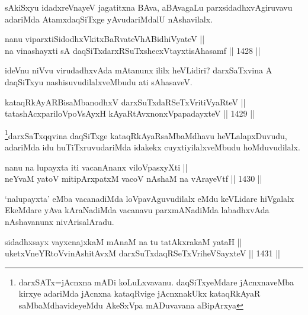 \begin{artha}
sAkiSxyu idadxreVnayeV jagatitxna BAva, aBAvagaLu parxsidadhxvAgiruvavu adariMda AtamxdaqSiTxge yAvudariMdalU nAshavilalx.
\end{artha}


\begin{shl}
nanu viparxtiSidodhxVkitxBaRvateVhABidhiVyateV || \\
na vinashayxti sA daqSiTxdarxRSuTxshecxVtayxtisAhasamf ||  1428 ||  
\end{shl}

\begin{artha}
ideVnu niVvu virudadhxvAda mAtanunx ililx heVLidiri? darxSaTxvina A daqSiTxyu nashisuvudilalxveMbudu ati sAhasaveV.
\end{artha}


\begin{shl}
kataqRkAyARBisaMbanodhxV darxSuTxdaRSeTxVritiVyaRteV || \\
tatashAcxpariloVpoV\s sAyxH kAyaRtAvxnonxVpapadayxteV ||  1429 ||  
\end{shl}

\begin{artha}
\footnote{darxSATx=jAcnxna mADi koLuLxvavanu. daqSiTxyeMdare jAcnxnaveMba kirxye adariMda jAcnxna kataqRvige jAcnxnakUkx kataqRkAyaR saMbaMdhavideyeMdu AkeSxVpa mADuvavana aBipArxya}darxSaTxqqvina daqSiTxge kataqRkAyaRsaMbaMdhavu heVLalapxDuvudu, adariMda idu huTiTxruvudariMda idakekx cuyxtiyilalxveMbudu hoMduvudilalx.
\end{artha}


\begin{shl}
nanu na lupayxta iti vacanAnanx viloVpasxyXti || \\
neYvaM yatoV mitipArxpatxM vacoV nAshaM na vArayeVtf ||  1430 ||  
\end{shl}

\begin{artha}
`nalupayxta' eMba vacanadiMda loVpavAguvudilalx eMdu keVLidare hiVgalalx EkeMdare yAva kAraNadiMda vacanavu parxmANadiMda labadhxvAda nAshavanunx nivArisalAradu.
\end{artha}


\begin{shl}
sidadhxsayx vayxcnajxkaM mAnaM na tu tatAkxrakaM yataH || \\
uketxVneYRtoV\s vinAshitAvxM darxSuTxdaqRSeTxVriheVSayxteV ||  1431 ||  
\end{shl}

